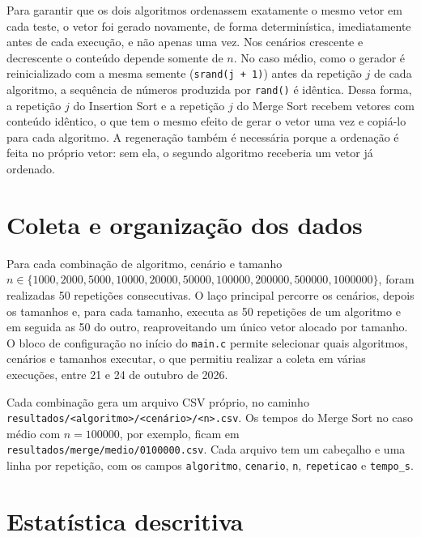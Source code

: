 \documentclass[
    12pt,
    oneside,
    a4paper,
    openany,
    chapter=TITLE,
    english,
    brazil
]{abntex2}
\begin{document}
Para garantir que os dois algoritmos ordenassem exatamente o mesmo vetor em cada teste, o vetor foi gerado novamente, de forma determinística, imediatamente antes de cada execução, e não apenas uma vez. Nos cenários crescente e decrescente o conteúdo depende somente de $n$. No caso médio, como o gerador é reinicializado com a mesma semente (\texttt{srand(j + 1)}) antes da repetição $j$ de cada algoritmo, a sequência de números produzida por \texttt{rand()} é idêntica. Dessa forma, a repetição $j$ do Insertion Sort e a repetição $j$ do Merge Sort recebem vetores com conteúdo idêntico, o que tem o mesmo efeito de gerar o vetor uma vez e copiá-lo para cada algoritmo. A regeneração também é necessária porque a ordenação é feita no próprio vetor: sem ela, o segundo algoritmo receberia um vetor já ordenado.

\section{Coleta e organização dos dados}

Para cada combinação de algoritmo, cenário e tamanho $n \in \{\num{1000},\allowbreak \num{2000},\allowbreak \num{5000},\allowbreak \num{10000},\allowbreak \num{20000},\allowbreak \num{50000},\allowbreak \num{100000},\allowbreak \num{200000},\allowbreak \num{500000},\allowbreak \num{1000000}\}$, foram realizadas 50 repetições consecutivas. O laço principal percorre os cenários, depois os tamanhos e, para cada tamanho, executa as 50 repetições de um algoritmo e em seguida as 50 do outro, reaproveitando um único vetor alocado por tamanho. O bloco de configuração no início do \texttt{main.c} permite selecionar quais algoritmos, cenários e tamanhos executar, o que permitiu realizar a coleta em várias execuções, entre 21 e 24 de outubro de 2026.

Cada combinação gera um arquivo CSV próprio, no caminho \texttt{resultados/\allowbreak<algoritmo>/\allowbreak<cenário>/\allowbreak<n>.csv}. Os tempos do Merge Sort no caso médio com $n = \num{100000}$, por exemplo, ficam em \texttt{resultados/\allowbreak merge/\allowbreak medio/\allowbreak 0100000.csv}. Cada arquivo tem um cabeçalho e uma linha por repetição, com os campos \texttt{algoritmo}, \texttt{cenario}, \texttt{n}, \texttt{repeticao} e \texttt{tempo\_s}.

\section{Estatística descritiva}
\label{sec:estatistica}
\end{document}
